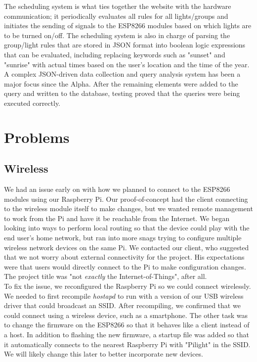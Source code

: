 \documentclass[10pt,draftclsnofoot,onecolumn]{IEEEtran}
\begin{document}
The scheduling system is what ties together the website with the hardware
communication; it periodically evaluates all rules for all lights/groups and
initiates the sending of signals to the ESP8266 modules based on which lights
are to be turned on/off.  The scheduling system is also in charge of parsing
the group/light rules that are stored in JSON format into boolean logic
expressions that can be evaluated, including replacing keywords such as
"sunset" and "sunrise" with actual times based on the user's location and the
time of the year. A complex JSON-driven data collection and query analysis
system has been a major focus since the Alpha. After the remaining elements
were added to the query and written to the database, testing proved that the
queries were being executed correctly.

\section{Problems}

\subsection{Wireless}

We had an issue early on with how we planned to connect to the ESP8266 modules
using our Raspberry Pi. Our proof-of-concept had the client connecting to the
wireless module itself to make changes, but we wanted remote management to work
from the Pi and have it be reachable from the Internet. We began looking into
ways to perform local routing so that the device could play with the end user's
home network, but ran into more snags trying to configure multiple wireless
network devices on the same Pi. We contacted our client, who suggested that we
not worry about external connectivity for the project. His expectations were
that users would directly connect to the Pi to make configuration changes. The
project title was "not \textit{exactly} the Internet-of-Things", after all.\\

To fix the issue, we reconfigured the Raspberry Pi so we could connect
wirelessly. We needed to first recompile \textit{hostapd} to run with a version
of our USB wireless driver that could broadcast an SSID. After recompiling, we
confirmed that we could connect using a wireless device, such as a smartphone.
The other task was to change the firmware on the ESP8266 so that it behaves
like a client instead of a host. In addition to flashing the new firmware, a
startup file was added so that it automatically connects to the nearest
Raspberry Pi with "Pilight" in the SSID. We will likely change this later to
better incorporate new devices.
\end{document}
